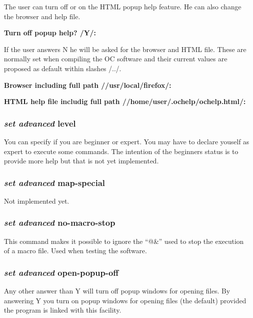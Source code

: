 \documentclass[11pt]{article}
\begin{document}
The user can turn off or on the HTML popup help feature.  He can also
change the browser and help file.

{\bf Turn off popup help? /Y/:}

If the user answers N he will be asked for the browser and HTML file.
These are normally set when compiling the OC software and their
current values are proposed as default within slashes /../.

{\bf Browser including full path //usr/local/firefox/:}

{\bf HTML help file includig full path //home/user/.ochelp/ochelp.html/:}

\hypertarget{Set adv level}{}
\subsubsection{{\em set advanced} level}

You can specify if you are beginner or expert.  You may have to
declare youself as expert to execute some commands.  The intention of
the beginners status is to provide more help but that is not yet
implemented.

\subsubsection{{\em set advanced} map-special}

Not implemented yet.

\hypertarget{Set adv no-macro-stop}{}
\subsubsection{{\em set advanced} no-macro-stop}

This command makes it possible to ignore the ``@\&'' used to stop the
execution of a macro file.  Used when testing the software.

\hypertarget{Set adv open popup}{}
\subsubsection{{\em set advanced} open-popup-off}

Any other answer than Y will turn off popup windows for opening files.
By answering Y you turn on popup windows for opening files (the
default) provided the program is linked with this facility.
\end{document}
